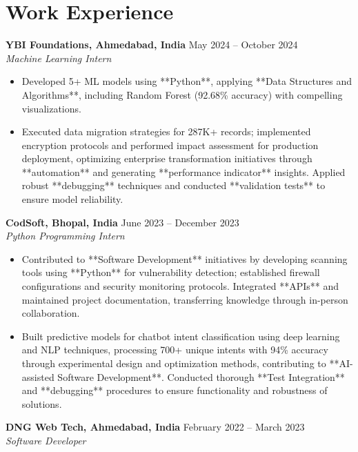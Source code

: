 \documentclass[a4paper,10pt]{article}
\begin{document}
\section*{Work Experience}
\textbf{YBI Foundations, Ahmedabad, India} \hfill May 2024 -- October 2024\\
\textit{Machine Learning Intern} \\
\begin{itemize}[leftmargin=*, itemsep=0pt, parsep=1pt]
\vspace{-6mm}
\item Developed 5+ ML models using **Python**, applying **Data Structures and Algorithms**, including Random Forest (92.68\% accuracy) with compelling visualizations.
\item Executed data migration strategies for 287K+ records; implemented encryption protocols and performed impact assessment for production deployment, optimizing enterprise transformation initiatives through **automation** and generating **performance indicator** insights. Applied robust **debugging** techniques and conducted **validation tests** to ensure model reliability.
\end{itemize}
\textbf{CodSoft, Bhopal, India} \hfill June 2023 -- December 2023\\
\textit{Python Programming Intern} \\
\begin{itemize}[leftmargin=*, itemsep=0pt, parsep=1pt]
\vspace{-6mm}
\item Contributed to **Software Development** initiatives by developing scanning tools using **Python** for vulnerability detection; established firewall configurations and security monitoring protocols. Integrated **APIs** and maintained project documentation, transferring knowledge through in-person collaboration.
\item Built predictive models for chatbot intent classification using deep learning and NLP techniques, processing 700+ unique intents with 94\% accuracy through experimental design and optimization methods, contributing to **AI-assisted Software Development**. Conducted thorough **Test Integration** and **debugging** procedures to ensure functionality and robustness of solutions.
\vspace{-1mm}
\end{itemize}

\textbf{DNG Web Tech, Ahmedabad, India} \hfill February 2022 -- March 2023 \\
\textit{Software Developer} \\
\end{document}
